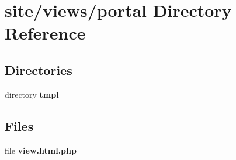 \section{site/views/portal Directory Reference}
\label{dir_5b28b856188d7b8400f27ccda1ce6965}
\subsection*{Directories}
\begin{DoxyCompactItemize}
\item 
directory \textbf{ tmpl}
\end{DoxyCompactItemize}
\subsection*{Files}
\begin{DoxyCompactItemize}
\item 
file \textbf{ view.\+html.\+php}
\end{DoxyCompactItemize}
